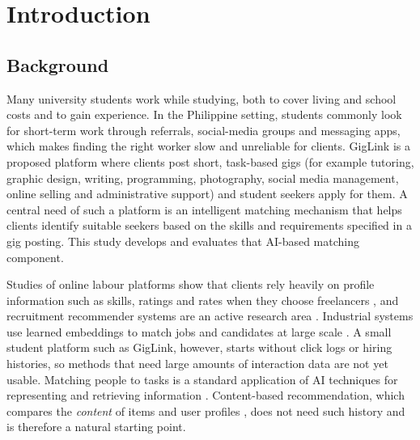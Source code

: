 \documentclass[12pt,a4paper]{article}
\numberwithin{equation}{section}
\theoremstyle{definition}
\theoremstyle{plain}
\begin{document}
\setcounter{page}{1}

\section{Introduction}\label{sec:intro}

\subsection{Background}
Many university students work while studying, both to cover living and school costs and to gain experience. In the Philippine setting, students commonly look for short-term work through referrals, social-media groups and messaging apps, which makes finding the right worker slow and unreliable for clients. GigLink is a proposed platform where clients post short, task-based gigs (for example tutoring, graphic design, writing, programming, photography, social media management, online selling and administrative support) and student seekers apply for them. A central need of such a platform is an intelligent matching mechanism that helps clients identify suitable seekers based on the skills and requirements specified in a gig posting. This study develops and evaluates that AI-based matching component.

Studies of online labour platforms show that clients rely heavily on profile information such as skills, ratings and rates when they choose freelancers \citep{ren2023hiring}, and recruitment recommender systems are an active research area \citep{freire2021erecruitment,deruijt2021job}. Industrial systems use learned embeddings to match jobs and candidates at large scale \citep{zhao2021embedding}. A small student platform such as GigLink, however, starts without click logs or hiring histories, so methods that need large amounts of interaction data are not yet usable. Matching people to tasks is a standard application of AI techniques for representing and retrieving information \citep{russell2021aima,manning2008introduction}. Content-based recommendation, which compares the \emph{content} of items and user profiles \citep{lops2011content}, does not need such history and is therefore a natural starting point.
\end{document}
